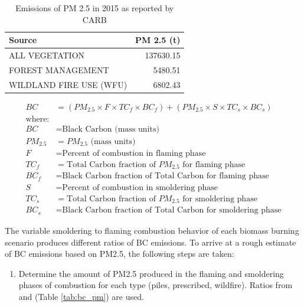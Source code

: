 \documentclass[a4paper]{article}
\begin{document}
\begin{table}[htb]
\caption{Emissions of PM 2.5 in 2015 as reported by CARB \label{tab:arb_pm_ann}}
\centering
\begin{tabular}{lr}
Source & PM 2.5 (t)\\
\hline
ALL VEGETATION & 137630.15\\
FOREST MANAGEMENT & 5480.51\\
WILDLAND FIRE USE (WFU) & 6802.43\\
\end{tabular}
\end{table}



\begin{align}
BC &= \left( PM_{2.5} \times F \times TC_f \times BC_f\right) + \left( PM_{2.5} \times S \times TC_s \times BC_s\right) \label{eq-bc} \\
\text{where:} \nonumber \\
BC &= \text{Black Carbon (mass units)} \nonumber \\
PM_{2.5} &= PM_{2.5} \text{ (mass units)} \nonumber \\
F &= \text{Percent of combustion in flaming phase} \nonumber \\
TC_f &= \text{Total Carbon fraction of } PM_{2.5} \text{ for flaming phase} \nonumber \\
BC_f &= \text{Black Carbon fraction of Total Carbon for flaming phase} \nonumber \\
S &= \text{Percent of combustion in smoldering phase} \nonumber \\
TC_s &= \text{Total Carbon fraction of } PM_{2.5} \text{ for smoldering phase} \nonumber \\
BC_s &= \text{Black Carbon fraction of Total Carbon for smoldering phase} \nonumber
\end{align}


The variable smoldering to flaming combustion behavior of each biomass burning scenario produces different
ratios of BC emissions. To arrive at a rough estimate of BC emissions based on PM2.5, the
following steps are taken:

\begin{enumerate}
\item Determine the amount of PM2.5 produced in the flaming and smoldering
phases of combustion for each type (piles, prescribed,
wildfire). Ratios from \citet{Ward1989} and \citet{Jenk1996} (Table \ref{tab:bc_pm}) are used.
\end{enumerate}
\end{document}
